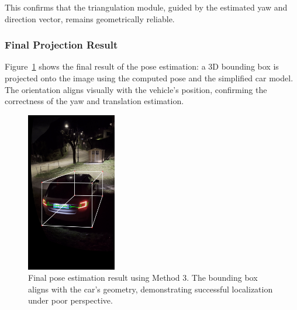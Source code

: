 This confirms that the triangulation module, guided by the estimated yaw and direction vector, remains geometrically reliable.

\subsubsection{Final Projection Result}
Figure~\ref{fig:method3_result} shows the final result of the pose estimation: a 3D bounding box is projected onto the image using the computed pose and the simplified car model. The orientation aligns visually with the vehicle's position, confirming the correctness of the yaw and translation estimation.

\begin{figure}[h]
    \centering
    \includegraphics[width=0.35\textwidth]{Images/method3/final_bounding_box_method3.jpg}
    \caption{Final pose estimation result using Method 3. The bounding box aligns with the car's geometry, demonstrating successful localization under poor perspective.}
    \label{fig:method3_result}
\end{figure}